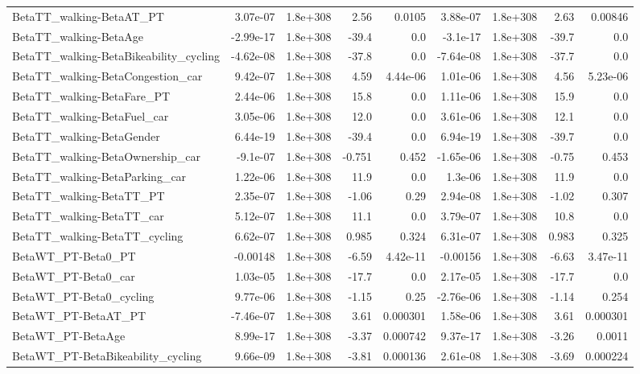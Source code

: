 \begin{tabular}{lrrrrrrrr}
BetaTT_walking-BetaAT_PT & 3.07e-07 & 1.8e+308 & 2.56 & 0.0105 & 3.88e-07 & 1.8e+308 & 2.63 & 0.00846 \\
BetaTT_walking-BetaAge & -2.99e-17 & 1.8e+308 & -39.4 & 0.0 & -3.1e-17 & 1.8e+308 & -39.7 & 0.0 \\
BetaTT_walking-BetaBikeability_cycling & -4.62e-08 & 1.8e+308 & -37.8 & 0.0 & -7.64e-08 & 1.8e+308 & -37.7 & 0.0 \\
BetaTT_walking-BetaCongestion_car & 9.42e-07 & 1.8e+308 & 4.59 & 4.44e-06 & 1.01e-06 & 1.8e+308 & 4.56 & 5.23e-06 \\
BetaTT_walking-BetaFare_PT & 2.44e-06 & 1.8e+308 & 15.8 & 0.0 & 1.11e-06 & 1.8e+308 & 15.9 & 0.0 \\
BetaTT_walking-BetaFuel_car & 3.05e-06 & 1.8e+308 & 12.0 & 0.0 & 3.61e-06 & 1.8e+308 & 12.1 & 0.0 \\
BetaTT_walking-BetaGender & 6.44e-19 & 1.8e+308 & -39.4 & 0.0 & 6.94e-19 & 1.8e+308 & -39.7 & 0.0 \\
BetaTT_walking-BetaOwnership_car & -9.1e-07 & 1.8e+308 & -0.751 & 0.452 & -1.65e-06 & 1.8e+308 & -0.75 & 0.453 \\
BetaTT_walking-BetaParking_car & 1.22e-06 & 1.8e+308 & 11.9 & 0.0 & 1.3e-06 & 1.8e+308 & 11.9 & 0.0 \\
BetaTT_walking-BetaTT_PT & 2.35e-07 & 1.8e+308 & -1.06 & 0.29 & 2.94e-08 & 1.8e+308 & -1.02 & 0.307 \\
BetaTT_walking-BetaTT_car & 5.12e-07 & 1.8e+308 & 11.1 & 0.0 & 3.79e-07 & 1.8e+308 & 10.8 & 0.0 \\
BetaTT_walking-BetaTT_cycling & 6.62e-07 & 1.8e+308 & 0.985 & 0.324 & 6.31e-07 & 1.8e+308 & 0.983 & 0.325 \\
BetaWT_PT-Beta0_PT & -0.00148 & 1.8e+308 & -6.59 & 4.42e-11 & -0.00156 & 1.8e+308 & -6.63 & 3.47e-11 \\
BetaWT_PT-Beta0_car & 1.03e-05 & 1.8e+308 & -17.7 & 0.0 & 2.17e-05 & 1.8e+308 & -17.7 & 0.0 \\
BetaWT_PT-Beta0_cycling & 9.77e-06 & 1.8e+308 & -1.15 & 0.25 & -2.76e-06 & 1.8e+308 & -1.14 & 0.254 \\
BetaWT_PT-BetaAT_PT & -7.46e-07 & 1.8e+308 & 3.61 & 0.000301 & 1.58e-06 & 1.8e+308 & 3.61 & 0.000301 \\
BetaWT_PT-BetaAge & 8.99e-17 & 1.8e+308 & -3.37 & 0.000742 & 9.37e-17 & 1.8e+308 & -3.26 & 0.0011 \\
BetaWT_PT-BetaBikeability_cycling & 9.66e-09 & 1.8e+308 & -3.81 & 0.000136 & 2.61e-08 & 1.8e+308 & -3.69 & 0.000224 \\

\end{tabular}
